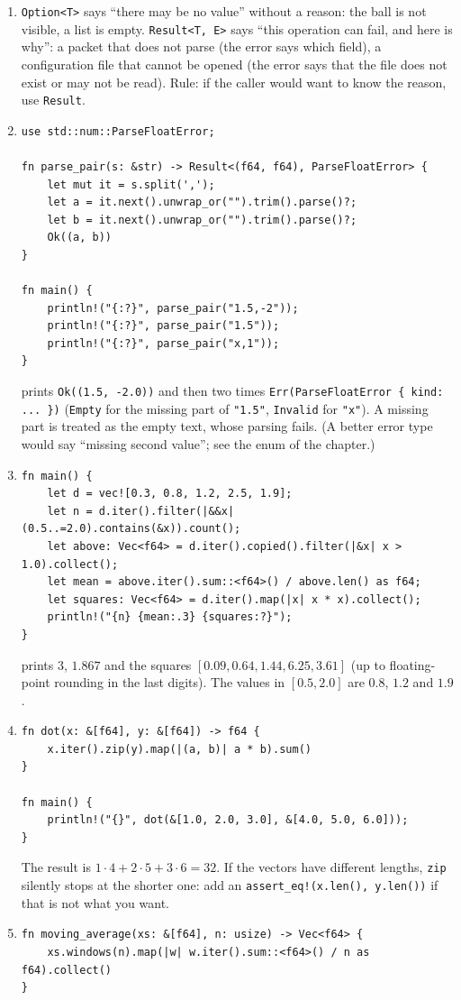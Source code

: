\begin{enumerate}[label=\textbf{\ansnum.\arabic*}]
  \item \verb!Option<T>! says ``there may be no value'' without a reason: the ball is not visible, a list is empty. \verb!Result<T, E>! says ``this operation can fail, and here is why'': a packet that does not parse (the error says which field), a configuration file that cannot be opened (the error says that the file does not exist or may not be read). Rule: if the caller would want to know the reason, use \verb!Result!.
  \item
\begin{verbatim}
use std::num::ParseFloatError;

fn parse_pair(s: &str) -> Result<(f64, f64), ParseFloatError> {
    let mut it = s.split(',');
    let a = it.next().unwrap_or("").trim().parse()?;
    let b = it.next().unwrap_or("").trim().parse()?;
    Ok((a, b))
}

fn main() {
    println!("{:?}", parse_pair("1.5,-2"));
    println!("{:?}", parse_pair("1.5"));
    println!("{:?}", parse_pair("x,1"));
}
\end{verbatim}
prints \verb!Ok((1.5, -2.0))! and then two times \verb!Err(ParseFloatError { kind: ... })! (\verb!Empty! for the missing part of \verb!"1.5"!, \verb!Invalid! for \verb!"x"!). A missing part is treated as the empty text, whose parsing fails. (A better error type would say ``missing second value''; see the enum of the chapter.)
  \item
\begin{verbatim}
fn main() {
    let d = vec![0.3, 0.8, 1.2, 2.5, 1.9];
    let n = d.iter().filter(|&&x| (0.5..=2.0).contains(&x)).count();
    let above: Vec<f64> = d.iter().copied().filter(|&x| x > 1.0).collect();
    let mean = above.iter().sum::<f64>() / above.len() as f64;
    let squares: Vec<f64> = d.iter().map(|x| x * x).collect();
    println!("{n} {mean:.3} {squares:?}");
}
\end{verbatim}
prints $3$, $1.867$ and the squares $[0.09, 0.64, 1.44, 6.25, 3.61]$ (up to floating-point rounding in the last digits). The values in $[0.5,2.0]$ are $0.8$, $1.2$ and $1.9$.
  \item
\begin{verbatim}
fn dot(x: &[f64], y: &[f64]) -> f64 {
    x.iter().zip(y).map(|(a, b)| a * b).sum()
}

fn main() {
    println!("{}", dot(&[1.0, 2.0, 3.0], &[4.0, 5.0, 6.0]));
}
\end{verbatim}
The result is $1\cdot4+2\cdot5+3\cdot6=32$. If the vectors have different lengths, \verb!zip! silently stops at the shorter one: add an \verb|assert_eq!(x.len(), y.len())| if that is not what you want.
  \item
\begin{verbatim}
fn moving_average(xs: &[f64], n: usize) -> Vec<f64> {
    xs.windows(n).map(|w| w.iter().sum::<f64>() / n as f64).collect()
}


\end{verbatim}
\end{enumerate}
